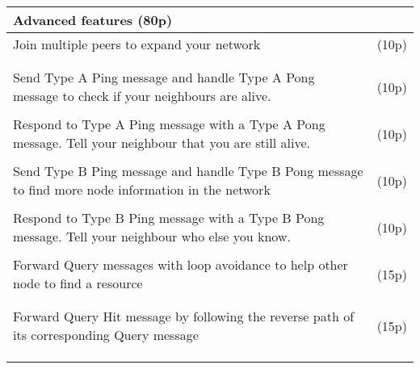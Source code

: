 \documentclass[12pt, a4paper]{article}
\begin{document}
\begin{table}[htdp]
\begin{center}
\begin{tabular}{|p{6cm}|p{10cm}|}
\multicolumn{2}{l}{Advanced features (80p)}\\
\hline
Join multiple peers to expand your network & (10p)\\
&\\
&\\
\hline
Send Type A Ping message and handle Type A Pong message to check if your neighbours are alive. & (10p)\\
&\\
\hline
Respond to Type A Ping message with a Type A Pong message.
Tell your neighbour that you are still alive. & (10p)\\
&\\
\hline
Send Type B Ping message and handle Type B Pong message to find more node information in the network & (10p) \\
&\\
\hline
Respond to Type B Ping message with a Type B Pong message.
Tell your neighbour who else you know. & (10p) \\
&\\
\hline
Forward Query messages with loop avoidance to help other node to find a resource & (15p) \\
&\\
&\\
\hline
Forward Query Hit message by following the reverse path of its corresponding Query message & (15p)\\
&\\
&\\
&\\
\hline
\end{tabular}
\end{center}
\end{table}
\end{document}
